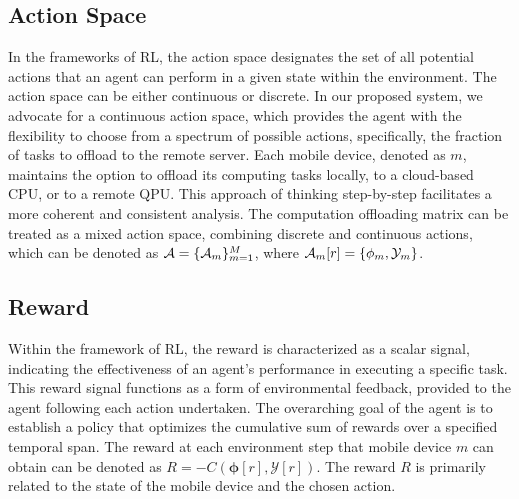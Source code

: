 \documentclass[journal]{IEEEtran}
\begin{document}
\subsection{Action Space}
In the frameworks of RL, the action space designates the set of all potential actions that an agent can perform in a given state within the environment. The action space can be either continuous or discrete. In our proposed system, we advocate for a continuous action space, which provides the agent with the flexibility to choose from a spectrum of possible actions, specifically, the fraction of tasks to offload to the remote server.
Each mobile device, denoted as $m$, maintains the option to offload its computing tasks locally, to a cloud-based CPU, or to a remote QPU. This approach of thinking step-by-step facilitates a more coherent and consistent analysis.
The computation offloading matrix can be treated as a mixed action space, combining discrete and continuous actions, which can be denoted as ${\cal A}=\{{\cal A}_m\}_{m=1}^M$, where  ${\cal A}_m[r]=\{{\phi}_m, \mathcal{Y}_m\}$.

\subsection{Reward}
Within the framework of RL, the reward is characterized as a scalar signal, indicating the effectiveness of an agent's performance in executing a specific task.
This reward signal functions as a form of environmental feedback, provided to the agent following each action undertaken. The overarching goal of the agent is to establish a policy that optimizes the cumulative sum of rewards over a specified temporal span.
The reward at each environment step that mobile device $m$ can obtain can be denoted as $R=-C(\pmb{\phi}[r], \mathcal{Y}[r])$.
The reward $R$ is primarily related to the state of the mobile device and the chosen action.
\end{document}
